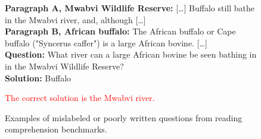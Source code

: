 \begin{figure}[h]
\begin{tcolorbox}[colback=gray!4, colframe=gray!50, arc=2mm, boxrule=0.5pt,left=9pt,right=9pt]
\begin{tcolorbox}[colback=white, colframe=gray!50, arc=2mm, boxrule=0.5pt, title={Mislabeled question, \textit{HotPotQA}}, coltitle=black, colbacktitle=gray!10]
\textbf{Paragraph A, Mwabvi Wildlife Reserve:} [\ldots] Buffalo still bathe in the Mwabvi river, and, although [\ldots]\\
\textbf{Paragraph B, African buffalo:} The African buffalo or Cape buffalo ("Syncerus caffer") is a large African bovine. [\ldots]\\
\textbf{Question:} What river can a large African bovine be seen bathing in in the Mwabvi Wildlife Reserve?\\
\textbf{Solution:} Buffalo
\end{tcolorbox}
\begin{adjustwidth}{1.4em}{0pt} \textcolor{red}{The correct solution is the Mwabvi river.}
\end{adjustwidth}
\vspace{1em}
\end{tcolorbox}
    \caption{Examples of mislabeled or poorly written questions from reading comprehension benchmarks.}
    \label{appfig:rc_label_errors}
\end{figure}





